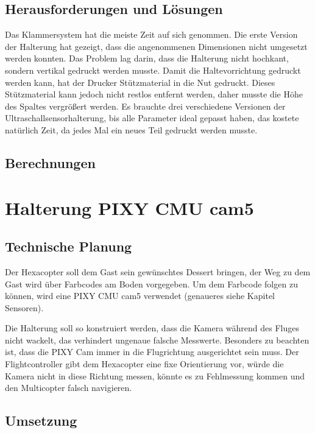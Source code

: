 	\subsection{Herausforderungen und Lösungen}

	Das Klammersystem hat die meiste Zeit auf sich genommen.
	Die erste Version der Halterung hat gezeigt, dass die angenommenen Dimensionen nicht umgesetzt werden konnten.
	Das Problem lag darin, dass die Halterung nicht hochkant, sondern vertikal gedruckt werden musste.
	Damit die Haltevorrichtung gedruckt werden kann, hat der Drucker Stützmaterial in die Nut gedruckt.
	Dieses Stützmaterial kann jedoch nicht restlos entfernt werden, daher musste die Höhe des Spaltes vergrößert werden.
	Es brauchte drei verschiedene Versionen der Ultraschallsensorhalterung, bis alle Parameter ideal gepasst haben, das kostete natürlich Zeit, da jedes Mal ein neues Teil gedruckt werden musste.

	\subsection{Berechnungen}

	

			\newpage

\section{Halterung PIXY CMU cam5}

	\subsection{Technische Planung}

	Der Hexacopter soll dem Gast sein gewünschtes Dessert bringen, der Weg zu dem Gast wird über Farbcodes am Boden vorgegeben.
	Um dem Farbcode folgen zu können, wird eine PIXY CMU cam5 verwendet (genaueres siehe Kapitel Sensoren).

	Die Halterung soll so konstruiert werden, dass die Kamera während des Fluges nicht wackelt, das verhindert ungenaue \bzw falsche Messwerte.
	Besonders zu beachten ist, dass die PIXY Cam immer in die Flugrichtung ausgerichtet sein muss.
	Der Flightcontroller gibt dem Hexacopter eine fixe Orientierung vor, würde die Kamera nicht in diese Richtung messen, könnte es zu Fehlmessung kommen und den Multicopter falsch navigieren.

	\subsection{Umsetzung}

